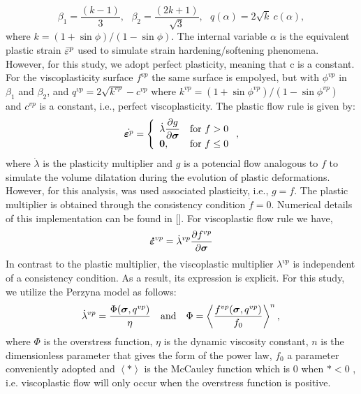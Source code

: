 \documentclass[a4paper,fleqn]{cas-sc}
\begin{document}
\begin{equation}
	\label{eq:f_DP_inscrita_MC}
	\beta_1 = \dfrac{(k-1)}{3}, ~~~ \beta_2 = \dfrac{(2k+1)}{\sqrt{3}}, ~~~
	q(\alpha) = 2\sqrt{k}~c(\alpha),
\end{equation}
where $k = (1+\sin{\phi})/(1-\sin{\phi})$. The internal variable $\alpha$ is the equivalent plastic strain $\bar \varepsilon^p$ used to simulate strain hardening/softening phenomena. However, for this study, we adopt perfect plasticity, meaning that c is a constant. For the viscoplasticity surface $f^{vp}$ the same surface is empolyed, but with $\phi^{vp}$ in $\beta_1$ and $\beta_2$, and $q^{vp} = 2\sqrt{k^{vp}}-c^{vp}$ where $k^{vp} = (1+\sin{\phi^{vp}})/(1-\sin{\phi^{vp}})$ and $c^{vp}$ is a constant, i.e., perfect viscoplasticity. 
The plastic flow rule is given by:
\begin{equation}
	\label{eq_plastic_flow}
	\dot {\boldsymbol{\varepsilon}^{p}} = \left\{ 
	\begin{array}{ll} 
		\dot \lambda \dfrac{\partial g}{\partial \boldsymbol{\sigma}} &  \text{for } f > 0 \\ 
		\boldsymbol 0, & \text{for } f \le 0 \\
	\end{array}\right.,
\end{equation}
where $\dot \lambda$ is the plasticity multiplier and $g$ is a potencial flow analogous to $f$ to simulate the volume dilatation during the evolution of plastic deformations. However, for this analysis, was used associated plasticity, i.e., $g=f$. The plastic multiplier is obtained through the consistency condition $\dot f = 0$. Numerical details of this implementation can be found in []. For viscoplastic flow rule we have,
\begin{equation}
	\label{eq_viscoplastic_flow}
	\boldsymbol{\dot{\varepsilon}}^{vp} = \dot \lambda^{vp} \dfrac{\partial f^{vp}}{\partial \boldsymbol{\sigma}}
\end{equation}
In contrast to the plastic multiplier, the viscoplastic multiplier $\lambda^{vp}$ is independent of a consistency condition. As a result, its expression is explicit. For this study, we utilize the Perzyna model as follows:
\begin{equation} \label{eq_perzyna_model}
	\dot \lambda^{vp} = \dfrac{\Phi(\boldsymbol{\sigma},q^{vp})}{\eta}~~~\text{and}~~~\Phi = \left\langle  \dfrac{f^{vp}(\boldsymbol{\sigma},q^{vp})}{f_0} \right\rangle^n, \,
\end{equation} where $\Phi$ is the overstress function, $\eta$ is the dynamic viscosity constant, $n$ is the dimensionless parameter that gives the form of the power law, $f_0$ a parameter conveniently adopted and $\left\langle * \right\rangle$ is the McCauley function which is $0$ when $* <0$ , i.e. viscoplastic flow will only occur when the overstress function is positive.
\end{document}
